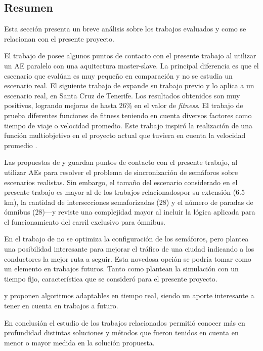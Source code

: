 \subsection{Resumen}
Esta sección presenta un breve análisis sobre los trabajos evaluados y como se relacionan con el presente proyecto.

El trabajo de \citet{Sanchez2004} posee algunos puntos de contacto con el presente trabajo al utilizar un AE paralelo con una aquitectura master-slave. La principal diferencia es que el escenario que evalúan es muy pequeño en comparación y no se estudia un escenario real.
El siguiente trabajo de \citet{Sanchez2008} expande su trabajo previo y lo aplica a un escenario real, en Santa Cruz de Tenerife. Los resultados obtenidos son muy positivos, logrando mejoras de hasta 26\% en el valor de \emph{fitness}. 
El trabajo de \citep{Sanchez2010} prueba diferentes funciones de fitness teniendo en cuenta diversos factores como tiempo de viaje o velocidad promedio. Este trabajo inspiró la realización de una función multiobjetivo en el proyecto actual que tuviera en cuenta la velocidad promedio .

Las propuestas de \citet{Sanchez2008} y \citet{Rouphail2000} guardan puntos de contacto con el presente trabajo, al utilizar AEs para resolver el problema de sincronización de semáforos sobre escenarios realistas. Sin embargo, el tamaño del escenario considerado en el presente trabajo es mayor al de los trabajos relacionadospor su extensión (6.5 km), la cantidad de intersecciones semaforizadas (28) y el número de paradas de ómnibus (28)---y reviste una complejidad mayor al incluir la lógica aplicada para el funcionamiento del carril exclusivo para ómnibus.

En el trabajo de \citet{Stolfi2012} no se optimiza la configuración de los semáforos, pero plantea una posibilidad interesante para mejorar el tráfico de una ciudad indicando a los conductores la mejor ruta a seguir. Esta novedosa opción se podría tomar como un elemento en trabajos futuros. Tanto \citet{Teo2010} como \citet{Stolfi2012} plantean la simulación con un tiempo fijo, característica que se consideró para el presente proyecto.

\citet{Montana1996} y \citet{Vogel2000}  proponen algoritmos adaptables en tiempo real, siendo un aporte interesante a tener en cuenta en trabajos a futuro.

En conclusión el estudio de los trabajos relacionados permitió conocer más en profundidad distintas soluciones y métodos que fueron tenidos en cuenta en menor o mayor medida en la solución propuesta.

